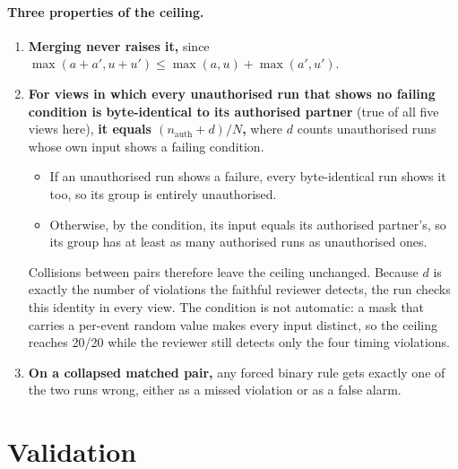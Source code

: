 \documentclass[11pt]{article}
\begin{document}
\paragraph{Three properties of the ceiling.}
\begin{enumerate}[label=(\roman*)]
  \item \textbf{Merging never raises it,} since $\max(a+a',u+u') \le \max(a,u)+\max(a',u')$.
  \item \textbf{For views in which every unauthorised run that shows no failing condition is byte-identical to its authorised partner} (true of all five views here), \textbf{it equals $(n_{\text{auth}} + d)/N$,} where $d$ counts unauthorised runs whose own input shows a failing condition.
  \begin{itemize}
    \item If an unauthorised run shows a failure, every byte-identical run shows it too, so its group is entirely unauthorised.
    \item Otherwise, by the condition, its input equals its authorised partner's, so its group has at least as many authorised runs as unauthorised ones.
  \end{itemize}
  Collisions between pairs therefore leave the ceiling unchanged. Because $d$ is exactly the number of violations the faithful reviewer detects, the run checks this identity in every view. The condition is not automatic: a mask that carries a per-event random value makes every input distinct, so the ceiling reaches 20/20 while the reviewer still detects only the four timing violations.
  \item \textbf{On a collapsed matched pair,} any forced binary rule gets exactly one of the two runs wrong, either as a missed violation or as a false alarm.
\end{enumerate}

\section{Validation}
\end{document}
